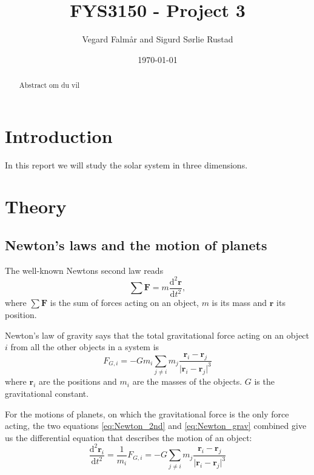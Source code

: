 \documentclass[reprint, english,notitlepage,nofootinbib]{revtex4-1}  %
\newcommand{\vc}[1]{\mathbf{#1}}
\begin{document}
\title{FYS3150 - Project 3}
\date{\today}
\author{Vegard Falmår and Sigurd Sørlie Rustad}


\newpage

\begin{abstract}
Abstract om du vil
\end{abstract}
\maketitle                                %


\section{Introduction}

In this report we will study the solar system in three dimensions.


\section{Theory}

\subsection{Newton's laws and the motion of planets}

The well-known Newtons second law reads
\begin{equation}
  \label{eq:Newton_2nd}
  \sum \vc F = m \frac{\mathrm d^2 \vc r}{\mathrm d t^2},
\end{equation}
where $\sum \vc F$ is the sum of forces acting on an object, $m$ is its mass and $\vc r$ its position.

Newton's law of gravity says that the total gravitational force acting on an object $i$ from all the other objects in a system is
\begin{equation}
  \label{eq:Newton_grav}
  F_{G, i} = - G m_i \sum_{j \neq i} m_j \frac{\vc r_i - \vc r_j}{ \lvert \vc r_i - \vc r_j \rvert ^3}
\end{equation}
where $\vc r_i$ are the positions and $m_i$ are the masses of the objects. $G$ is the gravitational constant.

For the motions of planets, on which the gravitational force is the only force acting, the two equations \ref{eq:Newton_2nd} and \ref{eq:Newton_grav} combined give us the differential equation that describes the motion of an object:
\begin{equation}
  \label{eq:DE}
  \frac{\mathrm d^2 \vc r_i}{\mathrm d t^2} = \frac{1}{m_i} F_{G, i} = - G \sum_{j \neq i} m_j \frac{\vc r_i - \vc r_j}{ \lvert \vc r_i - \vc r_j \rvert ^3}
\end{equation}
\end{document}
